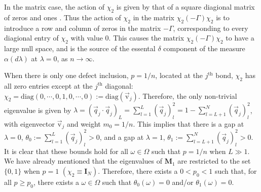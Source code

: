 \documentclass[english,12pt,jmp,graphicx]{revtex4-1}
\begin{document}
In the matrix case, the action of $\chi_2$ is given by that of a square
diagional matrix of zeros and ones \cite{Golden:JoB:337}. Thus
the action of $\chi_2$ in the matrix $\chi_2(-\Gamma)\chi_2$ is to introduce a row
and column of zeros in the matrix $-\Gamma$, corresponding to every
diagional entry of $\chi_2$ with value 0. This causes the matrix
$\chi_2(-\Gamma)\chi_2$ to have a large null space, and is the source of the
essental $\delta$ component of the measure $\alpha(d\lambda)$ at $\lambda=0$, as
$n\to\infty$.

When there is only one defect inclusion, $p=1/n$, located at
the $j^{\text{th}}$ bond, $\chi_2$ has all zero entries except at the $j^{\text{th}}$
diagonal:
$\chi_2=\text{diag}(0,\cdots,0,1,0,\cdots,0):=\text{diag}(\vec{\text{v}}_j)$. Therefore,
the only non-trivial eigenvalue is given by 
$\lambda=(\vec{q}_j\cdot\vec{q}_j)_L=\sum_{l=1}^L(\vec{q}_j)_l^2=1-\sum_{l=L+1}^N(\vec{q}_j)_l^2$, 
with eigenvector $\vec{\text{v}}_j$ and weight $m_0=1/n$. This  
implies that there is a gap at $\lambda=0$, $\theta_0:=\sum_{l=1}^L(\vec{q}_j)_l^2>0$,
and a gap at $\lambda=1$, $\theta_1:=\sum_{l=L+1}^N(\vec{q}_j)_l^2>0$. It is clear
that these bounds hold for all $\omega\in\Omega$ such that $p=1/n$ when $L\gg1$. We
have already mentioned that the eigenvalues of $\mathbf{M}_1$ are
restricted to the set $\{0,1\}$ when $p=1$
$(\chi_2\equiv\mathbf{I}_N)$. Therefore, there exists a $0<p_0<1$ such that,
for all $p\geq p_0$, there exists a $\omega\in\Omega$ such that $\theta_0(\omega)=0$ and/or
$\theta_1(\omega)=0$.

%
\end{document}
